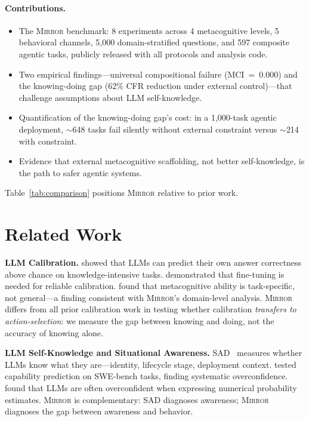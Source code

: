 \documentclass[10pt]{article}
\newcommand{\mirror}{\textsc{Mirror}}
\newcommand{\MCI}{MCI}
\newcommand{\CFR}{CFR}
\begin{document}
\paragraph{Contributions.}
\begin{itemize}
  \setlength\itemsep{2pt}
  \item The \mirror{} benchmark: 8 experiments across 4 metacognitive levels, 5
        behavioral channels, 5,000 domain-stratified questions, and 597 composite
        agentic tasks, publicly released with all protocols and analysis code.
  \item Two empirical findings---universal compositional failure
        (\MCI{}~=~0.000) and the knowing-doing gap (62\% \CFR{} reduction
        under external control)---that challenge assumptions about LLM
        self-knowledge.
  \item Quantification of the knowing-doing gap's cost: in a 1,000-task agentic
        deployment, $\sim$648 tasks fail silently without external constraint
        versus $\sim$214 with constraint.
  \item Evidence that external metacognitive scaffolding, not better
        self-knowledge, is the path to safer agentic systems.
\end{itemize}

Table~\ref{tab:comparison} positions \mirror{} relative to prior work.



\section{Related Work}
\label{sec:related}

\textbf{LLM Calibration.}
\citet{kadavath2022language} showed that LLMs can predict their own answer
correctness above chance on knowledge-intensive tasks.
\citet{kapoor2024calibration} demonstrated that fine-tuning is needed for reliable
calibration. \citet{steyvers2025calibration} found that metacognitive ability is
task-specific, not general---a finding consistent with \mirror{}'s domain-level
analysis. \mirror{} differs from all prior calibration work in testing whether
calibration \textit{transfers to action-selection}: we measure the gap between
knowing and doing, not the accuracy of knowing alone.

\textbf{LLM Self-Knowledge and Situational Awareness.}
SAD~\citep{laine2024me} measures whether LLMs know what they are---identity,
lifecycle stage, deployment context. \citet{barkan2025llms} tested capability
prediction on SWE-bench tasks, finding systematic overconfidence.
\citet{xiong2023can} found that LLMs are often overconfident when expressing
numerical probability estimates. \mirror{} is complementary: SAD diagnoses
awareness; \mirror{} diagnoses the gap between awareness and behavior.
\end{document}
